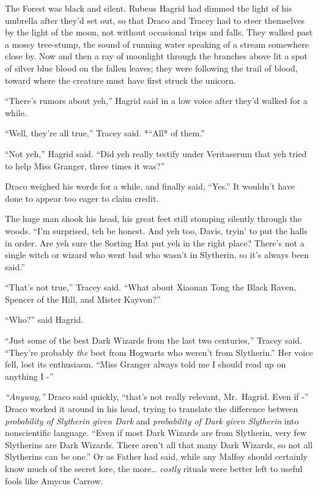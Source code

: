 The Forest was black and silent. Rubeus Hagrid had dimmed the light of
his umbrella after they'd set out, so that Draco and Tracey had to steer
themselves by the light of the moon, not without occasional trips and
falls. They walked past a mossy tree-stump, the sound of running water
speaking of a stream somewhere close by. Now and then a ray of moonlight
through the branches above lit a spot of silver blue blood on the fallen
leaves; they were following the trail of blood, toward where the
creature must have first struck the unicorn.

``There's rumors about yeh,'' Hagrid said in a low voice after they'd
walked for a while.

``Well, they're all true,'' Tracey said. *``All* of them.''

``Not yeh,'' Hagrid said. ``Did yeh really testify under Veritaserum
that yeh tried to help Miss Granger, three times it was?''

Draco weighed his words for a while, and finally said, ``Yes.'' It
wouldn't have done to appear too eager to claim credit.

The huge man shook his head, his great feet still stomping silently
through the woods. ``I'm surprised, teh be honest. And yeh too, Davis,
tryin' to put the halls in order. Are yeh sure the Sorting Hat put yeh
in the right place? There's not a single witch or wizard who went bad
who wasn't in Slytherin, so it's always been said.''

``That's not true,'' Tracey said. ``What about Xiaonan Tong the Black
Raven, Spencer of the Hill, and Mister Kayvon?''

``Who?'' said Hagrid.

``Just some of the best Dark Wizards from the last two centuries,''
Tracey said. ``They're probably \emph{the} best from Hogwarts who
weren't from Slytherin.'' Her voice fell, lost its enthusiasm. ``Miss
Granger always told me I should read up on anything I -''

\emph{``Anyway,''} Draco said quickly, ``that's not really relevant,
Mr.~Hagrid. Even if -'' Draco worked it around in his head, trying to
translate the difference between \emph{probability of Slytherin given
Dark} and \emph{probability of Dark given Slytherin} into nonscientific
language. ``Even if most Dark Wizards are from Slytherin, very few
Slytherins are Dark Wizards. There aren't all that many Dark Wizards, so
not all Slytherins can be one.'' Or as Father had said, while any Malfoy
should certainly know much of the secret lore, the more\ldots{}
\emph{costly} rituals were better left to useful fools like Amycus
Carrow.

